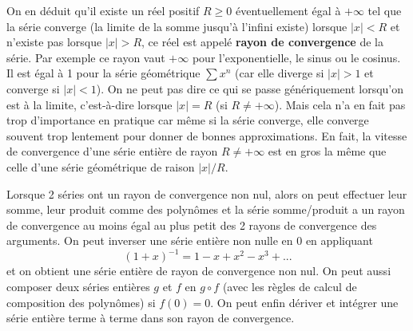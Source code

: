 \documentclass[a4paper,11pt]{book}
\begin{document}
\begin{giacjshere}
On en d\'eduit qu'il existe un réel
positif $R\geq 0$ éventuellement égal à $+\infty$ tel que 
la s\'erie converge (la limite de la somme jusqu'\`a l'infini existe) 
lorsque $|x|<R$ et n'existe pas lorsque
$|x|>R$, ce réel est appelé {\bf rayon de convergence} de la série.
Par exemple ce rayon vaut $+\infty$ pour l'exponentielle, le sinus
ou le cosinus. Il
est égal à 1 pour la série géométrique $\sum x^n$ (car elle diverge
si $|x|>1$ et converge si $|x|<1$). 
On ne peut pas dire ce qui se passe g\'en\'eriquement lorsqu'on
est \`a la limite, c'est-\`a-dire lorsque $|x|=R$ (si $R\neq
+\infty$). Mais cela n'a en fait pas trop d'importance en pratique
car m\^eme si la s\'erie converge, elle converge souvent trop lentement
pour donner de bonnes approximations. En fait, la vitesse de
convergence d'une s\'erie enti\`ere de rayon $R\neq +\infty$ est
en gros la m\^eme que celle d'une s\'erie g\'eom\'etrique de raison $|x|/R$.

Lorsque 2 séries ont un rayon de convergence non nul, alors on
peut effectuer leur somme, leur produit comme des polynômes et la
série somme/produit a un rayon de convergence au moins égal au plus
petit des 2 rayons de convergence des arguments. On peut inverser une série
entière non nulle en 0 en appliquant 
\[ (1+x)^{-1} = 1-x+x^2-x^3+... \]
et on obtient une série entière de rayon de
convergence non nul. On peut aussi composer deux séries entières
$g$ et $f$ en $g\circ f$ (avec les r\`egles de calcul de composition
des polyn\^omes) si $f(0)=0$. On peut enfin dériver
et intégrer une série entière terme à terme dans son rayon de convergence.


\end{giacjshere}
\end{document}
